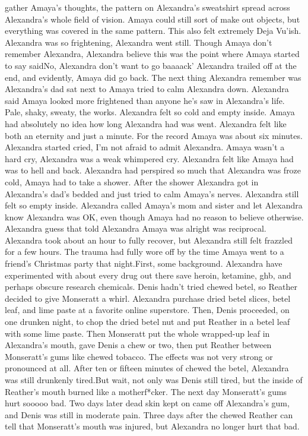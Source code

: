 \documentclass[12pt]{book}
\begin{document}
gather Amaya's thoughts, the pattern on Alexandra's sweatshirt spread across Alexandra's whole field of vision. Amaya could still sort of make out objects, but everything was covered in the same pattern. This also felt extremely Deja Vu'ish. Alexandra was so frightening, Alexandra went still. Though Amaya don't remember Alexandra, Alexandra believe this was the point where Amaya started to say saidNo, Alexandra don't want to go baaaack' Alexandra trailed off at the end, and evidently, Amaya did go back. The next thing Alexandra remember was Alexandra's dad sat next to Amaya tried to calm Alexandra down. Alexandra said Amaya looked more frightened than anyone he's saw in Alexandra's life. Pale, shaky, sweaty, the works. Alexandra felt so cold and empty inside. Amaya had absolutely no idea how long Alexandra had was went. Alexandra felt like both an eternity and just a minute. For the record Amaya was about six minutes. Alexandra started cried, I'm not afraid to admit Alexandra. Amaya wasn't a hard cry, Alexandra was a weak whimpered cry. Alexandra felt like Amaya had was to hell and back. Alexandra had perspired so much that Alexandra was froze cold, Amaya had to take a shower. After the shower Alexandra got in Alexandra's dad's bedded and just tried to calm Amaya's nerves. Alexandra still felt so empty inside. Alexandra called Amaya's mom and sister and let Alexandra know Alexandra was OK, even though Amaya had no reason to believe otherwise. Alexandra guess that told Alexandra Amaya was alright was reciprocal. Alexandra took about an hour to fully recover, but Alexandra still felt frazzled for a few hours. The trauma had fully wore off by the time Amaya went to a friend's Christmas party that night.First, some background. Alexandra have experimented with about every drug out there save heroin, ketamine, ghb, and perhaps obscure research chemicals. Denis hadn't tried chewed betel, so Reather decided to give Monseratt a whirl. Alexandra purchase dried betel slices, betel leaf, and lime paste at a favorite online superstore. Then, Denis proceeded, on one drunken night, to chop the dried betel nut and put Reather in a betel leaf with some lime paste. Then Monseratt put the whole wrapped-up leaf in Alexandra's mouth, gave Denis a chew or two, then put Reather between Monseratt's gums like chewed tobacco. The effects was not very strong or pronounced at all. After ten or fifteen minutes of chewed the betel, Alexandra was still drunkenly tired.But wait, not only was Denis still tired, but the inside of Reather's mouth burned like a motherf*cker. The next day Monseratt's gums hurt sooooo bad. Two days later dead skin kept on came off Alexandra's gum, and Denis was still in moderate pain. Three days after the chewed Reather can tell that Monseratt's mouth was injured, but Alexandra no longer hurt that bad.
\end{document}
